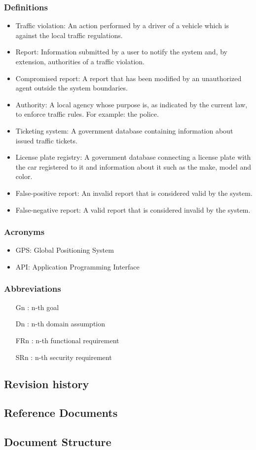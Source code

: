\subsubsection{Definitions}

\begin{itemize}
    \item
    Traffic violation: An action performed by a driver of a vehicle which is against the local traffic regulations.
    \item
    Report: Information submitted by a user to notify the system and, by extension, authorities of a traffic violation.
    \item
    Compromised report: A report that has been modified by an unauthorized agent outside the system boundaries.
    \item
    Authority: A local agency whose purpose is, as indicated by the current law, to enforce traffic rules. For example: the police.
    \item
    Ticketing system: A government database containing information about issued traffic tickets.
    \item
    License plate registry: A government database connecting a license plate with the car registered to it and information about it such as the make, model and color.
    \item
    False-positive report: An invalid report that is considered valid by the system.
    \item
    False-negative report: A valid report that is considered invalid by the system.
\end{itemize}


\subsubsection{Acronyms}
\begin{itemize}
    \item
    GPS: Global Positioning System
    \item
    API: Application Programming Interface
\end{itemize}


\subsubsection{Abbreviations}

\begin{itemize}
    \item
    [Gn]: n-th goal
    \item
    [Dn]: n-th domain assumption 
    \item
    [FRn]: n-th functional requirement
    \item
    [SRn]: n-th security requirement
\end{itemize}

\subsection{Revision history}
\subsection{Reference Documents}
\subsection{Document Structure}
